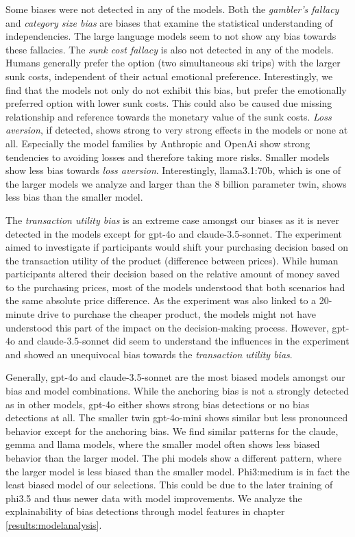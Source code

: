 \par Some biases were not detected in any of the models. Both the \textit{gambler's fallacy} and \textit{category size bias} are biases that examine the statistical understanding of independencies. The large language models seem to not show any bias towards these fallacies. The \textit{sunk cost fallacy} is also not detected in any of the models. Humans generally prefer the option (two simultaneous ski trips) with the larger sunk costs, independent of their actual emotional preference. Interestingly, we find that the models not only do not exhibit this bias, but prefer the emotionally preferred option with lower sunk costs. This could also be caused due missing relationship and reference towards the monetary value of the sunk costs. \textit{Loss aversion}, if detected, shows strong to very strong effects in the models or none at all. Especially the model families by Anthropic and OpenAi show strong tendencies to avoiding losses and therefore taking more risks. Smaller models show less bias towards \textit{loss aversion}. Interestingly, llama3.1:70b, which is one of the larger models we analyze and larger than the 8 billion parameter twin, shows less bias than the smaller model.

The \textit{transaction utility bias} is an extreme case amongst our biases as it is never detected in the models except for gpt-4o and claude-3.5-sonnet. The experiment aimed to investigate if participants would shift your purchasing decision based on the transaction utility of the product (difference between prices). While human participants altered their decision based on the relative amount of money saved to the purchasing prices, most of the models understood that both scenarios had the same absolute price difference. As the experiment was also linked to a 20-minute drive to purchase the cheaper product, the models might not have understood this part of the impact on the decision-making process. However, gpt-4o and claude-3.5-sonnet did seem to understand the influences in the experiment and showed an unequivocal bias towards the \textit{transaction utility bias}.

\par Generally, gpt-4o and claude-3.5-sonnet are the most biased models amongst our bias and model combinations. While the anchoring bias is not a strongly detected as in other models, gpt-4o either shows strong bias detections or no bias detections at all. The smaller twin gpt-4o-mini shows similar but less pronounced behavior except for the anchoring bias. We find similar patterns for the claude, gemma and llama models, where the smaller model often shows less biased behavior than the larger model. The phi models show a different pattern, where the larger model is less biased than the smaller model. Phi3:medium is in fact the least biased model of our selections. This could be due to the later training of phi3.5 and thus newer data with model improvements. We analyze the explainability of bias detections through model features in chapter \ref{results:modelanalysis}.


